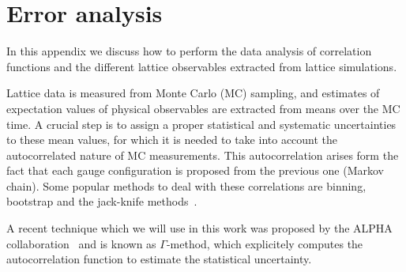 
\chapter{Error analysis}
\label{appex_errors}

In this appendix we discuss how to perform the data analysis of correlation functions and the different lattice observables extracted from lattice simulations. 

Lattice data is measured from Monte Carlo (MC) sampling, and estimates of expectation values of physical observables are extracted from means over the MC time. A crucial step is to assign a proper statistical and systematic uncertainties to these mean values, for which it is needed to take into account the autocorrelated nature of MC measurements. This autocorrelation arises form the fact that each gauge configuration is proposed from the previous one (Markov chain). Some popular methods to deal with these correlations are binning, bootstrap and the jack-knife methods~\cite{}.

A recent technique which we will use in this work was proposed by the ALPHA collaboration~\cite{Gamma-method} and is known as $\Gamma$-method, which explicitely computes the autocorrelation function to estimate the statistical uncertainty.

